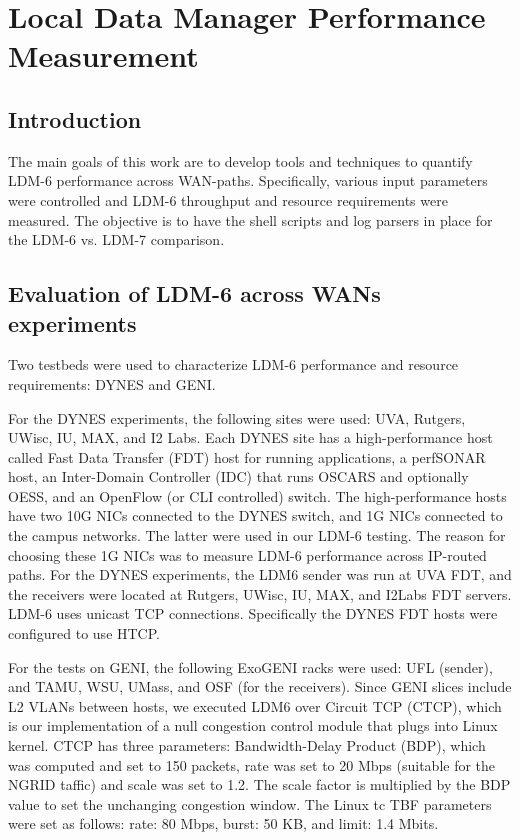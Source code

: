 \chapter{Local Data Manager Performance Measurement}
\label{sec:ldm}
\section{Introduction}
The main goals of this work are to develop
tools and techniques to quantify LDM-6 performance
across WAN-paths. Specifically, various input parameters
were controlled and LDM-6 throughput and resource requirements
were measured. The objective is to have the shell scripts
and log parsers in place for the LDM-6 vs. LDM-7 comparison.


\section{Evaluation of LDM-6 across WANs experiments}

Two testbeds were used to characterize LDM-6 performance and resource requirements: DYNES and GENI.

For the DYNES experiments, the following sites were used: UVA, Rutgers, UWisc, IU, MAX, and I2 Labs. Each DYNES site has a high-performance host called Fast Data Transfer (FDT) host
for running applications, a perfSONAR
host, an Inter-Domain Controller (IDC) that runs OSCARS and optionally OESS, and an OpenFlow (or CLI
controlled) switch. The high-performance hosts have two 10G NICs connected to the DYNES switch,
and 1G NICs connected to the campus networks. The latter were used in our LDM-6 testing. The reason for choosing these 1G NICs was to measure LDM-6 performance
across IP-routed paths. For the DYNES experiments, the LDM6 sender was run at UVA FDT, and the receivers
were located at Rutgers, UWisc, IU, MAX, and I2Labs FDT servers. LDM-6 uses
unicast TCP connections.  Specifically the DYNES FDT hosts were configured to use HTCP.

For the tests on GENI, the following ExoGENI racks were used: UFL (sender), and TAMU, WSU, UMass, and OSF
(for the receivers). Since GENI slices include L2 VLANs between hosts, we executed LDM6 over Circuit TCP (CTCP),
which is our implementation of a null congestion control module that plugs into Linux kernel. CTCP has three parameters: Bandwidth-Delay Product (BDP), which was computed and set to 150 packets, rate was set to 20 Mbps (suitable for the NGRID taffic) and scale was set to 1.2. The scale factor is multiplied by the BDP value to set the unchanging congestion window. The Linux tc TBF parameters were set as follows: rate: 80 Mbps, burst: 50 KB, and limit: 1.4 Mbits.

